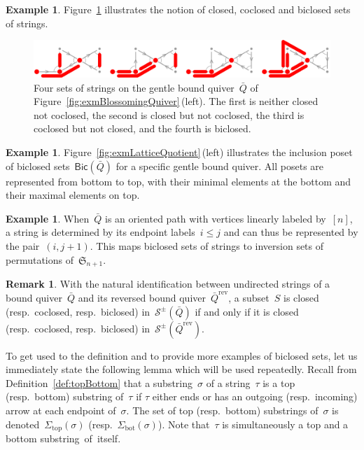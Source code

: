 \documentclass{amsart}
\theoremstyle{definition}
\newtheorem{example}[theorem]{Example}
\newtheorem{remark}[theorem]{Remark}
\newcommand{\fS}{\mathfrak{S}} %
\newcommand{\fref}[1]{Figure~\ref{#1}} %
\newcommand{\strings}{\mathcal{S}} %
\newcommand{\reversed}[1]{#1^{\mathrm{rev}}} %
\renewcommand{\top}{\mathrm{top}} %
\newcommand{\bottom}{\mathrm{bot}} %
\newcommand{\Bicl}[1]{\mathsf{Bic}(#1)} %
\begin{document}
\begin{example}
\fref{fig:exmBiclosed} illustrates the notion of closed, coclosed and biclosed sets of strings.

\begin{figure}[t]
	\capstart
	\centerline{\includegraphics[scale=.45]{exmBiclosed}}
	\caption{Four sets of strings on the gentle bound quiver~$\bar Q$ of \fref{fig:exmBlossomingQuiver}\,(left). The first is neither closed not coclosed, the second is closed but not coclosed, the third is coclosed but not closed, and the fourth is biclosed.}
	\label{fig:exmBiclosed}
\end{figure}
\end{example}

\begin{example}
\fref{fig:exmLatticeQuotient}\,(left) illustrates the inclusion poset of biclosed sets~$\Bicl{\bar Q}$ for a specific gentle bound quiver.
All posets are represented from bottom to top, with their minimal elements at the bottom and their maximal elements on top.
\end{example}

\begin{example}
When~$\bar Q$ is an oriented path with vertices linearly labeled by~$[n]$, a string is determined by its endpoint labels~$i \le j$ and can thus be represented by the pair~$(i,j+1)$.
This maps biclosed sets of strings to inversion sets of permutations of~$\fS_{n+1}$.
\end{example}

\begin{remark}
\label{rem:reverseBiclosed}
With the natural identification between undirected strings of a bound quiver~$\bar Q$ and its reversed bound quiver~$\reversed{\bar Q}$, a subset~$S$ is closed (resp.~coclosed, resp.~biclosed) in~$\strings^\pm(\bar Q)$ if and only if it is closed (resp.~coclosed, resp.~biclosed) in~$\strings^\pm(\reversed{\bar Q})$.
\end{remark}

\enlargethispage{.3cm}
To get used to the definition and to provide more examples of biclosed sets, let us immediately state the following lemma which will be used repeatedly.
Recall from Definition~\ref{def:topBottom} that a substring~$\sigma$ of a string~$\tau$ is a top (resp.~bottom) substring of~$\tau$ if $\tau$ either ends or has an outgoing (resp.~incoming) arrow at each endpoint of~$\sigma$.
The set of top (resp.~bottom) substrings of~$\sigma$ is denoted~$\Sigma_\top(\sigma)$ (resp.~$\Sigma_\bottom(\sigma)$).
Note that~$\tau$ is simultaneously a top and a bottom \mbox{substring of itself}.
\end{document}
